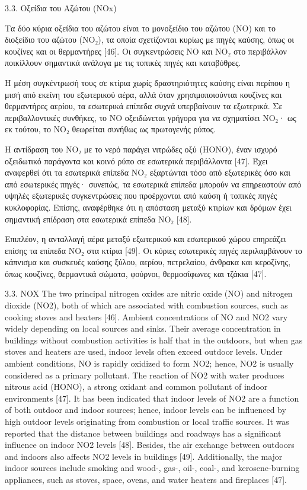 \cite{ijerph17238972}

3.3. Οξείδια του Αζώτου (NOx)

Τα δύο κύρια οξείδια του αζώτου είναι το μονοξείδιο του αζώτου (NO) και το διοξείδιο του αζώτου (NO₂), τα οποία σχετίζονται κυρίως με πηγές καύσης, όπως οι κουζίνες και οι θερμαντήρες [46]. Οι συγκεντρώσεις NO και NO₂ στο περιβάλλον ποικίλλουν σημαντικά ανάλογα με τις τοπικές πηγές και καταβόθρες.

Η μέση συγκέντρωσή τους σε κτίρια χωρίς δραστηριότητες καύσης είναι περίπου η μισή από εκείνη του εξωτερικού αέρα, αλλά όταν χρησιμοποιούνται κουζίνες και θερμαντήρες αερίου, τα εσωτερικά επίπεδα συχνά υπερβαίνουν τα εξωτερικά. Σε περιβαλλοντικές συνθήκες, το NO οξειδώνεται γρήγορα για να σχηματίσει NO₂· ως εκ τούτου, το NO₂ θεωρείται συνήθως ως πρωτογενής ρύπος.

Η αντίδραση του NO₂ με το νερό παράγει νιτρώδες οξύ (HONO), έναν ισχυρό οξειδωτικό παράγοντα και κοινό ρύπο σε εσωτερικά περιβάλλοντα [47]. Έχει αναφερθεί ότι τα εσωτερικά επίπεδα NO₂ εξαρτώνται τόσο από εξωτερικές όσο και από εσωτερικές πηγές· συνεπώς, τα εσωτερικά επίπεδα μπορούν να επηρεαστούν από υψηλές εξωτερικές συγκεντρώσεις που προέρχονται από καύση ή τοπικές πηγές κυκλοφορίας. Επίσης, αναφέρθηκε ότι η απόσταση μεταξύ κτιρίων και δρόμων έχει σημαντική επίδραση στα εσωτερικά επίπεδα NO₂ [48].

Επιπλέον, η ανταλλαγή αέρα μεταξύ εξωτερικού και εσωτερικού χώρου επηρεάζει επίσης τα επίπεδα NO₂ στα κτίρια [49]. Οι κύριες εσωτερικές πηγές περιλαμβάνουν το κάπνισμα και συσκευές καύσης ξύλου, αερίου, πετρελαίου, άνθρακα και κεροζίνης, όπως κουζίνες, θερμαντικά σώματα, φούρνοι, θερμοσίφωνες και τζάκια [47].

 3.3. NOX
The two principal nitrogen oxides are nitric oxide (NO) and nitrogen dioxide (NO2), both of which are associated with combustion sources, such as cooking stoves and heaters [46]. Ambient concentrations of NO and NO2 vary widely depending on local sources and sinks. Their average concentration in buildings without combustion activities is half that in the outdoors, but when gas stoves and heaters are used, indoor levels often exceed outdoor levels. Under ambient conditions, NO is rapidly oxidized to form NO2; hence, NO2 is usually considered as a primary pollutant. The reaction of NO2 with water produces nitrous acid (HONO), a strong oxidant and common pollutant of indoor environments [47]. It has been indicated that indoor levels of NO2 are a function of both outdoor and indoor sources; hence, indoor levels can be influenced by high outdoor levels originating from combustion or local traffic sources. It was reported that the distance between buildings and roadways has a significant influence on indoor NO2 levels [48]. Besides, the air exchange between outdoors and indoors also affects NO2 levels in buildings [49]. Additionally, the major indoor sources include smoking and wood-, gas-, oil-, coal-, and kerosene-burning appliances, such as stoves, space, ovens, and water heaters and fireplaces [47].



